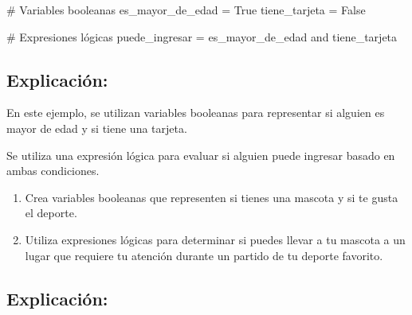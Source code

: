 \documentclass[
  a4paper,
  DIV=11,
  numbers=noendperiod,
  onepage,
  openany]{scrreprt}
\newenvironment{Shaded}{\begin{snugshade}}{\end{snugshade}}
\newcommand{\CommentTok}[1]{\textcolor[rgb]{0.37,0.37,0.37}{#1}}
\newcommand{\KeywordTok}[1]{\textcolor[rgb]{0.00,0.23,0.31}{#1}}
\newcommand{\NormalTok}[1]{\textcolor[rgb]{0.00,0.23,0.31}{#1}}
\newcommand{\OperatorTok}[1]{\textcolor[rgb]{0.37,0.37,0.37}{#1}}
\newcommand{\VariableTok}[1]{\textcolor[rgb]{0.07,0.07,0.07}{#1}}
\providecommand{\tightlist}{%
  \setlength{\itemsep}{0pt}\setlength{\parskip}{0pt}}\usepackage{longtable,booktabs,array}
\begin{document}
\begin{Shaded}
\begin{Highlighting}[]
\CommentTok{\# Variables booleanas}
\NormalTok{es\_mayor\_de\_edad }\OperatorTok{=} \VariableTok{True}
\NormalTok{tiene\_tarjeta }\OperatorTok{=} \VariableTok{False}

\CommentTok{\# Expresiones lógicas}
\NormalTok{puede\_ingresar }\OperatorTok{=}\NormalTok{ es\_mayor\_de\_edad }\KeywordTok{and}\NormalTok{ tiene\_tarjeta}
\end{Highlighting}
\end{Shaded}

\subsection{Explicación:}\label{explicaciuxf3n-12}

En este ejemplo, se utilizan variables booleanas para representar si
alguien es mayor de edad y si tiene una tarjeta.

Se utiliza una expresión lógica para evaluar si alguien puede ingresar
basado en ambas condiciones.

\begin{tcolorbox}[enhanced jigsaw, toptitle=1mm, toprule=.15mm, title=\textcolor{quarto-callout-tip-color}{\faLightbulb}\hspace{0.5em}{Actividad Práctica}, colbacktitle=quarto-callout-tip-color!10!white, opacitybacktitle=0.6, titlerule=0mm, colback=white, left=2mm, bottomrule=.15mm, breakable, bottomtitle=1mm, rightrule=.15mm, colframe=quarto-callout-tip-color-frame, arc=.35mm, leftrule=.75mm, coltitle=black, opacityback=0]

\begin{enumerate}
\def\labelenumi{\arabic{enumi}.}
\tightlist
\item
  Crea variables booleanas que representen si tienes una mascota y si te
  gusta el deporte.
\item
  Utiliza expresiones lógicas para determinar si puedes llevar a tu
  mascota a un lugar que requiere tu atención durante un partido de tu
  deporte favorito.
\end{enumerate}

\end{tcolorbox}

\subsection{Explicación:}\label{explicaciuxf3n-13}
\end{document}
